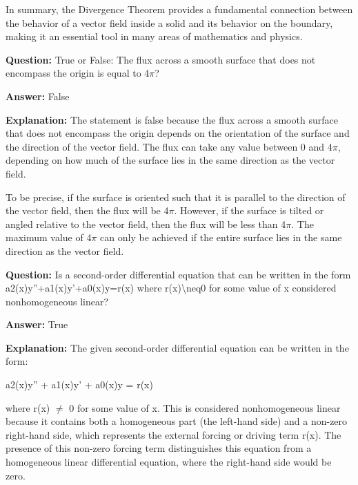 \documentclass{article}
\begin{document}
In summary, the Divergence Theorem provides a fundamental connection between the behavior of a vector field inside a solid and its behavior on the boundary, making it an essential tool in many areas of mathematics and physics.
                
                \vspace{0.5cm} 
        
            
                \textbf {Question:} True or False: The flux across a smooth surface that does not encompass the origin is equal to 4\ensuremath{\pi}?
                
                \textbf{Answer:} False

                \textbf{Explanation:} The statement is false because the flux across a smooth surface that does not encompass the origin depends on the orientation of the surface and the direction of the vector field. The flux can take any value between 0 and 4\ensuremath{\pi}, depending on how much of the surface lies in the same direction as the vector field.

To be precise, if the surface is oriented such that it is parallel to the direction of the vector field, then the flux will be 4\ensuremath{\pi}. However, if the surface is tilted or angled relative to the vector field, then the flux will be less than 4\ensuremath{\pi}. The maximum value of 4\ensuremath{\pi} can only be achieved if the entire surface lies in the same direction as the vector field.
                
                \vspace{0.5cm} 
        
            
                \textbf {Question:} Is a second-order differential equation that can be written in the form a2(x)y''+a1(x)y'+a0(x)y=r(x) where r(x){\textbackslash}neq0 for some value of x considered nonhomogeneous linear?
                
                \textbf{Answer:} True

                \textbf{Explanation:} The given second-order differential equation can be written in the form:

a2(x)y'' + a1(x)y' + a0(x)y = r(x)

where r(x) \ensuremath{\neq} 0 for some value of x. This is considered nonhomogeneous linear because it contains both a homogeneous part (the left-hand side) and a non-zero right-hand side, which represents the external forcing or driving term r(x). The presence of this non-zero forcing term distinguishes this equation from a homogeneous linear differential equation, where the right-hand side would be zero.
                
\end{document}
